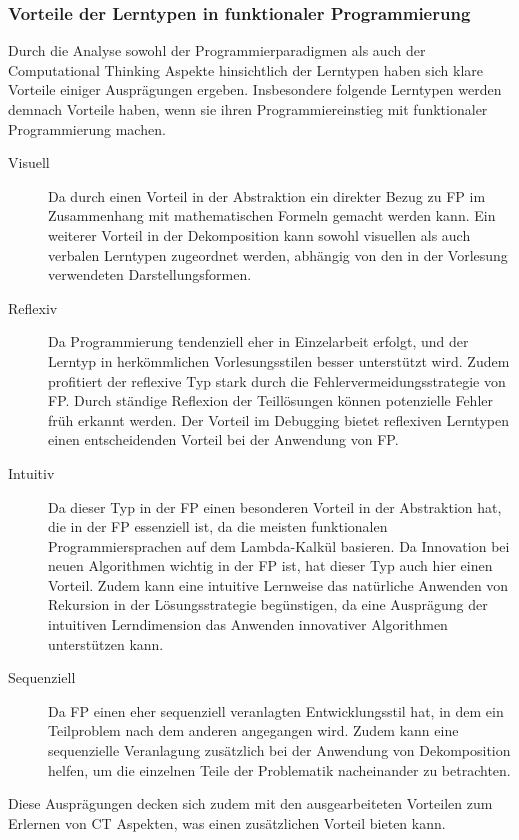\subsubsection{Vorteile der Lerntypen in funktionaler Programmierung}
Durch die Analyse sowohl der Programmierparadigmen als auch der Computational Thinking Aspekte hinsichtlich der Lerntypen haben sich klare Vorteile einiger Ausprägungen ergeben.
Insbesondere folgende Lerntypen werden demnach Vorteile haben, wenn sie ihren Programmiereinstieg mit funktionaler Programmierung machen.

\begin{description}
    \item[Visuell] Da durch einen Vorteil in der Abstraktion ein direkter Bezug zu FP im Zusammenhang mit mathematischen Formeln gemacht werden kann. Ein weiterer Vorteil in der Dekomposition kann sowohl visuellen als auch verbalen Lerntypen zugeordnet werden, abhängig von den in der Vorlesung verwendeten Darstellungsformen.
    \item[Reflexiv] Da Programmierung tendenziell eher in Einzelarbeit erfolgt, und der Lerntyp in herkömmlichen Vorlesungsstilen besser unterstützt wird. Zudem profitiert der reflexive Typ stark durch die Fehlervermeidungsstrategie von FP. Durch ständige Reflexion der Teillösungen können potenzielle Fehler früh erkannt werden. Der Vorteil im Debugging bietet reflexiven Lerntypen einen entscheidenden Vorteil bei der Anwendung von FP.
    \item[Intuitiv] Da dieser Typ in der FP einen besonderen Vorteil in der Abstraktion hat, die in der FP essenziell ist, da die meisten funktionalen Programmiersprachen auf dem Lambda-Kalkül basieren. Da Innovation bei neuen Algorithmen wichtig in der FP ist, hat dieser Typ auch hier einen Vorteil. Zudem kann eine intuitive Lernweise das natürliche Anwenden von Rekursion in der Lösungsstrategie begünstigen, da eine Ausprägung der intuitiven Lerndimension das Anwenden innovativer Algorithmen unterstützen kann.
    \item[Sequenziell] Da FP einen eher sequenziell veranlagten Entwicklungsstil hat, in dem ein Teilproblem nach dem anderen angegangen wird. Zudem kann eine sequenzielle Veranlagung zusätzlich bei der Anwendung von Dekomposition helfen, um die einzelnen Teile der Problematik nacheinander zu betrachten.
\end{description}

Diese Ausprägungen decken sich zudem mit den ausgearbeiteten Vorteilen zum Erlernen von CT Aspekten, was einen zusätzlichen Vorteil bieten kann.
\\
